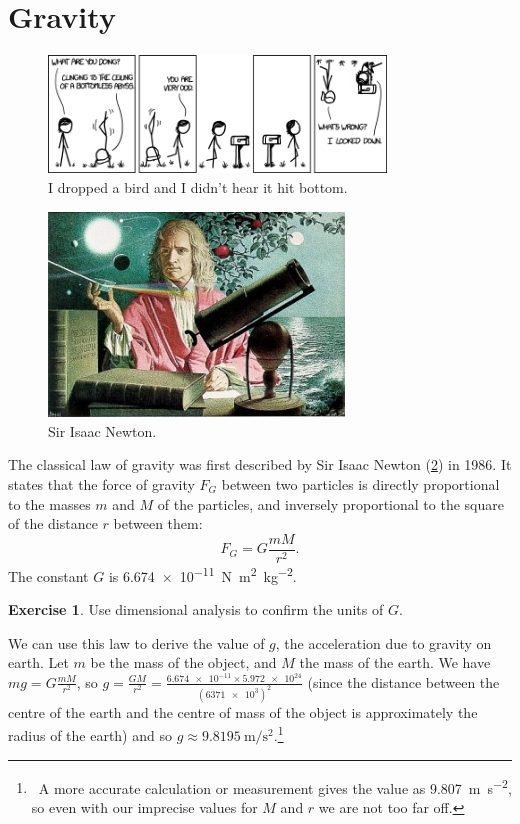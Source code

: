 \documentclass[a4paper]{amsbook}
\theoremstyle{definition}
\newtheorem{exercise}{Exercise}
\numberwithin{exercise}{chapter}
\numberwithin{exercise}{chapter}
\newcommand\capcite[1]{}
\begin{document}
\section{Gravity}
\begin{figure}
  \centering
  \includegraphics[width=0.8\textwidth]{sky}
  \caption{I dropped a bird and I didn't hear it hit bottom. \capcite{https://xkcd.com/1115/}\label{fig:sky}}
\end{figure}
\begin{figure}
  \centering
  \includegraphics[width=0.7\textwidth]{newton}
  \caption{Sir Isaac Newton. \capcite{http://teachertech.rice.edu/Participants/louviere/Newton/newton5.jpg}\label{fig:newton}}
\end{figure}
The classical law of gravity was first described by Sir Isaac Newton (\cref{fig:newton}) in 1986. It states that the force of
gravity $ F_G $ between two particles is directly proportional to the masses $ m $ and $ M $ of the particles, and inversely
proportional to the square of the distance $ r $ between them:
\begin{equation}
  F_G = G\frac{mM}{r^2}.
\end{equation}
The constant $ G $ is \SI{6.674e-11}{\newton\metre\squared\per\kilo\gram\squared}.

\begin{exercise}
  Use dimensional analysis to confirm the units of $ G $.
\end{exercise}

We can use this law to derive the value of $ g $, the acceleration due to gravity on earth. Let $ m $ be the mass of the object, and $ M $ the
mass of the earth. We have $ mg = G\frac{mM}{r^2} $, so $ g = \frac{GM}{r^2} = \frac{\num{6.674e-11} \times \num{5.972e24}}{(\num{6371e3})^2} $
(since the distance between the centre of the earth and the centre of mass of the object is approximately the radius of the earth) and
so $ g \approx \SI{9.8195}{\metre\per\second\squared} $.\footnote{~A more accurate calculation or measurement gives the value
as \SI{9.807}{\metre\per\second\squared}, so even with our imprecise values for $ M $ and $ r $ we are not too far off.}
\end{document}
